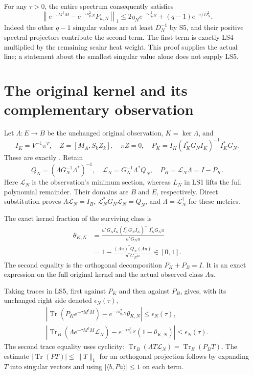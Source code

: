 \documentclass[11pt]{article}
\newcommand{\Tr}{\operatorname{Tr}}
\newcommand{\norm}[1]{\lVert#1\rVert}
\begin{document}
For any $\tau>0$, the entire spectrum consequently satisfies
\[
\boxed{\left\|e^{-\tau M^\dagger M}
 -e^{-\tau s_{q,N}^2}P_{u,N}\right\|_1
 \le 2\eta_N e^{-\tau s_{q,N}^2}
 +(q-1)e^{-\tau/D_N^2}.}
\tag{LS5}
\]
Indeed the other $q-1$ singular values are at least $D_N^{-1}$
by S5, and their positive spectral projectors contribute the
second term. The first term is exactly LS4 multiplied by the
remaining scalar heat weight. This proof supplies the actual
line; a statement about the smallest singular value alone does
not supply LS5.

\section{The original kernel and its complementary observation}
Let $\Lambda:E\to B$ be the unchanged original observation,
$K=\ker\Lambda$, and
\[
I_K=V^{-1}\pi^T,\quad Z=[M_A,S_kZ_k],\quad \pi Z=0,\quad
P_K=I_K(I_K^*G_NI_K)^{-1}I_K^*G_N .
\tag{LS6}
\]
These are exactly \cite[MR1--10]{MR}. Retain
\[
Q_N=(\Lambda G_N^{-1}\Lambda^*)^{-1},\quad
\mathcal L_N=G_N^{-1}\Lambda^*Q_N,\quad
P_B=\mathcal L_N\Lambda=I-P_K .
\]
Here $\mathcal L_N$ is the observation's minimum section, whereas
$L_N$ in LS1 lifts the full polynomial remainder. Their domains
are $B$ and $E$, respectively. Direct substitution proves
$\Lambda\mathcal L_N=I_B$,
$\mathcal L_N^*G_N\mathcal L_N=Q_N$, and
$\Lambda=\mathcal L_N^{\dagger}$ for these metrics.

The exact kernel fraction of the surviving class is
\[
\begin{split}
\theta_{K,N}
&=\frac{u^*G_N I_K(I_K^*G_NI_K)^{-1}I_K^*G_Nu}{u^*G_Nu}\\
&=1-\frac{(\Lambda u)^*Q_N(\Lambda u)}{u^*G_Nu}\in[0,1].
\end{split}\tag{LS7}
\]
The second equality is the orthogonal decomposition $P_K+P_B=I$.
It is an exact expression on the full original kernel and
the actual observed class $\Lambda u$.

Taking traces in LS5, first against $P_K$ and then against $P_B$,
gives, with its unchanged right side denoted $\epsilon_N(\tau)$,
\[
\begin{gathered}
\left|\Tr(P_K e^{-\tau M^\dagger M})
       -e^{-\tau s_{q,N}^2}\theta_{K,N}\right|
 \le\epsilon_N(\tau),\\
\left|\Tr_B\!\left(\Lambda e^{-\tau M^\dagger M}\mathcal L_N\right)
       -e^{-\tau s_{q,N}^2}(1-\theta_{K,N})\right|
 \le\epsilon_N(\tau).
\end{gathered}\tag{LS8}
\]
The second trace equality uses cyclicity:
$\Tr_B(\Lambda T\mathcal L_N)=\Tr_E(P_BT)$.
The estimate $|\Tr(PT)|\le\norm T_1$ for an orthogonal
projection follows by expanding $T$ into singular vectors and
using $|\langle b,Pa\rangle|\le1$ on each term.
\end{document}
